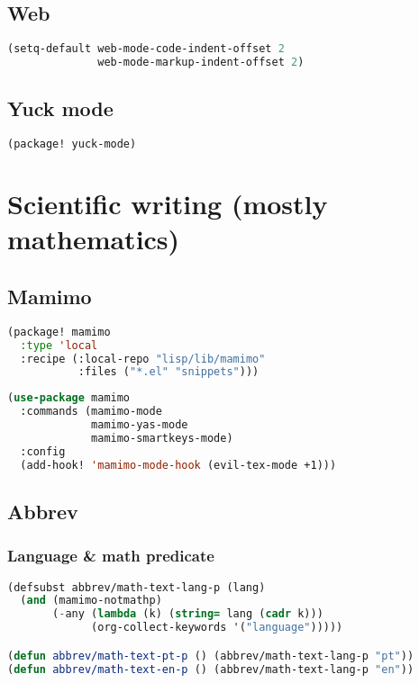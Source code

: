\documentclass[11pt]{article}
\begin{document}
\subsection{Web}
\label{sec:web}
\begin{lstlisting}[language=Lisp]
(setq-default web-mode-code-indent-offset 2
              web-mode-markup-indent-offset 2)
\end{lstlisting}

\subsection{Yuck mode}
\label{sec:yuck-mode}
\begin{lstlisting}[language=Lisp]
(package! yuck-mode)
\end{lstlisting}


\section{Scientific writing (mostly mathematics)}
\label{sec:scientific-writing-mostly-mathematics}


\subsection{Mamimo}
\label{sec:mamimo}
\begin{lstlisting}[language=Lisp]
(package! mamimo
  :type 'local
  :recipe (:local-repo "lisp/lib/mamimo"
           :files ("*.el" "snippets")))
\end{lstlisting}

\begin{lstlisting}[language=Lisp]
(use-package mamimo
  :commands (mamimo-mode
             mamimo-yas-mode
             mamimo-smartkeys-mode)
  :config
  (add-hook! 'mamimo-mode-hook (evil-tex-mode +1)))
\end{lstlisting}

\subsection{Abbrev}
\label{sec:abbrev-1}


\subsubsection{Language \& math predicate}
\label{sec:language-math-predicate}
\begin{lstlisting}[language=Lisp]
(defsubst abbrev/math-text-lang-p (lang)
  (and (mamimo-notmathp)
       (-any (lambda (k) (string= lang (cadr k)))
             (org-collect-keywords '("language")))))

(defun abbrev/math-text-pt-p () (abbrev/math-text-lang-p "pt"))
(defun abbrev/math-text-en-p () (abbrev/math-text-lang-p "en"))
\end{lstlisting}
\end{document}
